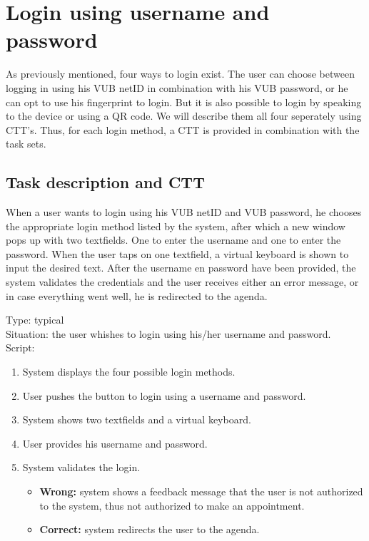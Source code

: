 \documentclass[11pt, a4paper,svglistings]{report}
\begin{document}
\section{\label{subsec:loginPass}Login using username and password}

As previously mentioned, four ways to login exist. The user can choose between logging in using his VUB netID in combination with his VUB password, or he can opt to use his fingerprint to login. But it is also possible to login by speaking to the device or using a QR code. We will describe them all four seperately using CTT's. Thus, for each login method, a CTT is provided in combination with the task sets.

\subsection{Task description and CTT}

When a user wants to login using his VUB netID and VUB password, he chooses the appropriate login method listed by the system, after which a new window pops up with two textfields. One to enter the username and one to enter the password. When the user taps on one textfield, a virtual keyboard is shown to input the desired text. After the username en password have been provided, the system validates the credentials and the user receives either an error message, or in case everything went well, he is redirected to the agenda.

Type: typical \\
Situation: the user whishes to login using his/her username and password. \\
Script:
\begin{enumerate}
\item System displays the four possible login methods.
\item User pushes the button to login using a username and password.
\item System shows two textfields and a virtual keyboard.
\item User provides his username and password.
\item System validates the login.
\begin{itemize}
\item \textbf{Wrong:} system shows a feedback message that the user is not authorized to the system, thus not authorized to make an appointment.
\item \textbf{Correct:} system redirects the user to the agenda.
\end{itemize}
\end{enumerate}
\end{document}
